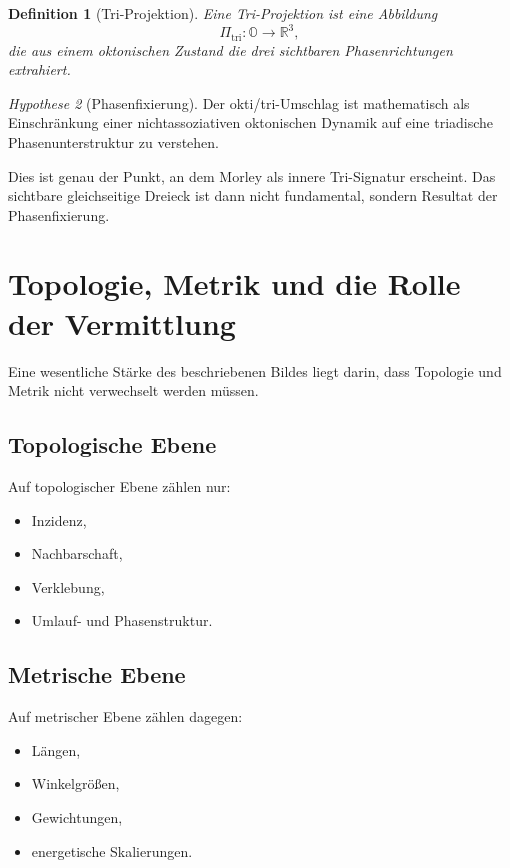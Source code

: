 \documentclass[11pt,a4paper]{article}
\newtheorem{definition}{Definition}[section]
\theoremstyle{remark}
\newtheorem{hypothese}[definition]{Hypothese}
\newcommand{\R}{\mathbb{R}}
\newcommand{\OO}{\mathbb{O}}
\begin{document}
	\begin{definition}[Tri-Projektion]
		Eine \emph{Tri-Projektion} ist eine Abbildung
		\begin{equation}
			\Pi_{\mathrm{tri}}: \OO \to \R^3,
		\end{equation}
		die aus einem oktonischen Zustand die drei sichtbaren Phasenrichtungen extrahiert.
	\end{definition}
	
	\begin{hypothese}[Phasenfixierung]
		Der okti/tri-Umschlag ist mathematisch als Einschränkung einer nichtassoziativen oktonischen Dynamik auf eine triadische Phasenunterstruktur zu verstehen.
	\end{hypothese}
	
	Dies ist genau der Punkt, an dem Morley als innere Tri-Signatur erscheint. Das sichtbare gleichseitige Dreieck ist dann nicht fundamental, sondern Resultat der Phasenfixierung.
	
	\section{Topologie, Metrik und die Rolle der Vermittlung}
	
	Eine wesentliche Stärke des beschriebenen Bildes liegt darin, dass Topologie und Metrik nicht verwechselt werden müssen.
	
	\subsection*{Topologische Ebene}
	Auf topologischer Ebene zählen nur:
	\begin{itemize}
		\item Inzidenz,
		\item Nachbarschaft,
		\item Verklebung,
		\item Umlauf- und Phasenstruktur.
	\end{itemize}
	
	\subsection*{Metrische Ebene}
	Auf metrischer Ebene zählen dagegen:
	\begin{itemize}
		\item Längen,
		\item Winkelgrößen,
		\item Gewichtungen,
		\item energetische Skalierungen.
	\end{itemize}
	
\end{document}
